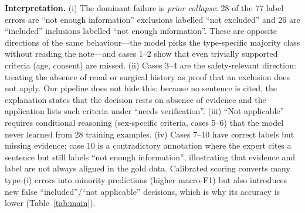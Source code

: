 \textbf{Interpretation.} (i) The dominant failure is \emph{prior collapse}: 28 of the 77 label errors are ``not enough information'' exclusions labelled ``not excluded'' and 26 are ``included'' inclusions labelled ``not enough information''. These are opposite directions of the same behaviour---the model picks the type-specific majority class without reading the note---and cases 1--2 show that even trivially supported criteria (age, consent) are missed. (ii) Cases 3--4 are the safety-relevant direction: treating the absence of renal or surgical history as proof that an exclusion does not apply. Our pipeline does not hide this: because no sentence is cited, the explanation states that the decision rests on absence of evidence and the application lists such criteria under ``needs verification''. (iii) ``Not applicable'' requires conditional reasoning (sex-specific criteria, cases 5--6) that the model never learned from 28 training examples. (iv) Cases 7--10 have correct labels but missing evidence; case 10 is a contradictory annotation where the expert cites a sentence but still labels ``not enough information'', illustrating that evidence and label are not always aligned in the gold data. Calibrated scoring converts many type-(i) errors into minority predictions (higher macro-F1) but also introduces new false ``included''/``not applicable'' decisions, which is why its accuracy is lower (Table~\ref{tab:main}).
